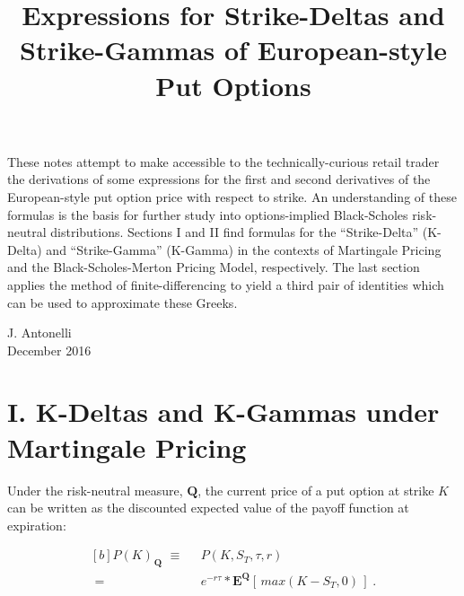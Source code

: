 \documentclass[12pt]{article}
\title{Expressions for Strike-Deltas and Strike-Gammas of European-style Put Options}
\date{}
\begin{document}
\maketitle

\begin{paragraph}
\indent \small These notes attempt to make accessible to the technically-curious retail trader the derivations of some expressions for the first and second derivatives of the European-style put option price with respect to strike. An understanding of these formulas is the basis for further study into options-implied Black-Scholes risk-neutral distributions. Sections I and II find formulas for the ``Strike-Delta'' (K-Delta) and ``Strike-Gamma'' (K-Gamma) in the contexts of Martingale Pricing and the Black-Scholes-Merton Pricing Model, respectively. The last section applies the method of finite-differencing to yield a third pair of identities which can be used to approximate these Greeks.
\end{paragraph}

\vspace{300pt}

\begin{center} 
\footnotesize J. Antonelli \\[3pt] December 2016
\end{center}

\pagebreak

\section*{\large I. \indent K-Deltas and K-Gammas under Martingale Pricing}

\vspace{15pt}

\begin{paragraph}
\indent Under the risk-neutral measure, $\mathbf{Q}$, the current price of a put option at strike $K$ can be written as the discounted expected value of the payoff function at expiration:
\end{paragraph}

\vspace{10pt}

\begin{equation}
\begin{aligned}[b]
P(K)_{\hspace{1pt} \mathbf{Q}}   \hspace{4pt} \equiv& \hspace{7pt}   P(K, S_{T}, \tau, r)
\\[12pt]
\hspace{4pt} =& \hspace{7pt}   e^{-r \tau} * \mathbf{E^{Q}}[\hspace{2pt} max(K-S_{T},0) \hspace{2pt}] \hspace{3pt}.
\end{aligned}
\end{equation}
\end{document}

